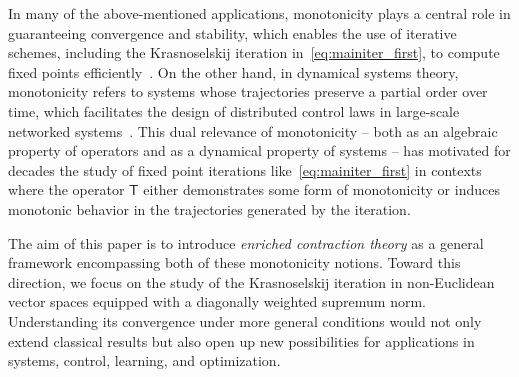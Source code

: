 \documentclass[journal,twoside,web]{ieeecolor}
\newcommand{\Ts}{\mathsf{T}}
\begin{document}
In many of the above-mentioned applications, monotonicity plays a central role in guaranteeing convergence and stability, which enables the use of iterative schemes, including the Krasnoselskij iteration in~\eqref{eq:mainiter_first}, to compute fixed points efficiently~\cite{winston2020monotone,pabbaraju2021estimating,Jafarpour21}.
%
%
On the other hand, in dynamical systems theory, monotonicity refers to systems whose trajectories preserve a partial order over time, which facilitates the design of distributed control laws in large-scale networked systems~\cite{manfredi2017necessary,jafarpour2022non,Deplano23,deplano24neural,kawano2025contraction,parasnis2025perron}.
%
This dual relevance of monotonicity -- both as an algebraic property of operators and as a dynamical property of systems -- has motivated for decades the study of fixed point iterations like~\eqref{eq:mainiter_first} in contexts where the operator $\Ts$ either demonstrates some form of monotonicity or induces monotonic behavior in the trajectories generated by the iteration.

The aim of this paper is to introduce \textit{enriched contraction theory} as a general framework encompassing both of these monotonicity notions.
%
Toward this direction, we focus on the study of the Krasnoselskij iteration in non-Euclidean vector spaces equipped with a diagonally weighted supremum norm. Understanding its convergence under more general conditions would not only extend classical results but also open up new possibilities for applications in systems, control, learning, and optimization.
\end{document}
